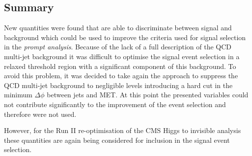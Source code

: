 \subsection{Summary}


New quantities were found that are able to discriminate between signal and background which could be used to improve the criteria used for signal selection in the \textit{prompt analysis}. Because of the lack of a full description of the \gls{QCD} multi-jet background it was difficult to optimise the signal event selection in a relaxed threshold region with a significant component of this background. To avoid this problem, it was decided to take again the approach to suppress the \gls{QCD} multi-jet background to negligible levels introducing a hard cut in the minimum $\Delta\phi$ between jets and \gls{MET}. At this point the presented variables could not contribute significantly to the improvement of the event selection and therefore were not used.

However, for the Run II re-optimisation of the \gls{CMS} Higgs to invisible analysis these quantities are again being considered for inclusion in the signal event selection.
